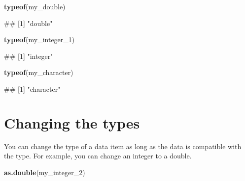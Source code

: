 \documentclass[
]{book}
\newenvironment{Shaded}{\begin{snugshade}}{\end{snugshade}}
\newcommand{\FunctionTok}[1]{\textcolor[rgb]{0.13,0.29,0.53}{\textbf{#1}}}
\newcommand{\NormalTok}[1]{#1}
\begin{document}
\begin{Shaded}
\begin{Highlighting}[]
\FunctionTok{typeof}\NormalTok{(my\_double)}
\end{Highlighting}
\end{Shaded}

\begin{Shaded}
\begin{Highlighting}[]
\NormalTok{\#\# [1] "double"}
\end{Highlighting}
\end{Shaded}

\begin{Shaded}
\begin{Highlighting}[]
\FunctionTok{typeof}\NormalTok{(my\_integer\_1)}
\end{Highlighting}
\end{Shaded}

\begin{Shaded}
\begin{Highlighting}[]
\NormalTok{\#\# [1] "integer"}
\end{Highlighting}
\end{Shaded}

\begin{Shaded}
\begin{Highlighting}[]
\FunctionTok{typeof}\NormalTok{(my\_character)}
\end{Highlighting}
\end{Shaded}

\begin{Shaded}
\begin{Highlighting}[]
\NormalTok{\#\# [1] "character"}
\end{Highlighting}
\end{Shaded}

\hypertarget{changing-the-types}{%
\section{Changing the types}\label{changing-the-types}}

You can change the type of a data item as long as the data is compatible with the type. For example, you can change an integer to a double.

\begin{Shaded}
\begin{Highlighting}[]
\FunctionTok{as.double}\NormalTok{(my\_integer\_2)}
\end{Highlighting}
\end{Shaded}
\end{document}
